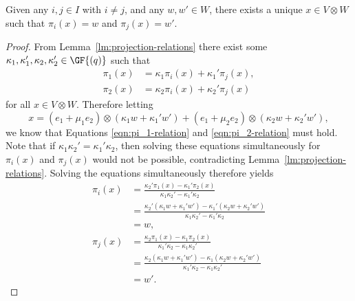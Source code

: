 \begin{lemma} \label{lm:two-projections-determines-tensor}
Given any $i, j \in I$ with $i \neq j$, and any $w, w' \in W$, there exists a unique $x \in V \otimes W$ such that $\pi_i{\left(x \right)} = w$ and $\pi_j{\left(x \right)} = w'$.
\end{lemma}
\begin{proof}
From Lemma~\ref{lm:projection-relations} there exist some $\kappa_1, \kappa_1', \kappa_2, \kappa_2' \in \GF{\left(q \right)}$ such that
\begin{align}
    \pi_1{\left(x \right)} &= \kappa_1 \pi_i{\left(x \right)} + \kappa_1' \pi_j{\left(x \right)}, \label{eqn:pi_1-relation} \\
    \pi_2{\left(x \right)} &= \kappa_2 \pi_i{\left(x \right)} + \kappa_2' \pi_j{\left(x \right)} \label{eqn:pi_2-relation}
\end{align}
for all $x \in V \otimes W$. Therefore letting
\begin{displaymath}
    x = \left(e_1 + \mu_1 e_2 \right) \otimes \left(\kappa_1 w + \kappa_1' w' \right) + \left(e_1 + \mu_2 e_2 \right) \otimes {\left(\kappa_2 w + \kappa_2' w' \right)},
\end{displaymath}
we know that Equations \eqref{eqn:pi_1-relation} and \eqref{eqn:pi_2-relation} must hold. Note that if $\kappa_1 \kappa_2' = \kappa_1' \kappa_2$, then solving these equations simultaneously for $\pi_i{\left(x \right)}$ and $\pi_j{\left(x \right)}$ would not be possible, contradicting Lemma~\ref{lm:projection-relations}. Solving the equations simultaneously therefore yields
\begin{align*}
    \pi_i{\left(x \right)} &= \frac{\kappa_2' \pi_1{\left(x \right)} - \kappa_1' \pi_2{\left(x \right)}}{\kappa_1 \kappa_2' - \kappa_1' \kappa_2} \\
    &= \frac{\kappa_2' \left(\kappa_1 w + \kappa_1' w' \right) - \kappa_1' \left(\kappa_2 w + \kappa_2' w' \right)}{\kappa_1 \kappa_2' - \kappa_1' \kappa_2} \\
    &= w, \\
    \pi_j{\left(x \right)} &= \frac{\kappa_2 \pi_1{\left(x \right)} - \kappa_1 \pi_2{\left(x \right)}}{\kappa_1' \kappa_2 - \kappa_1 \kappa_2'} \\
    &= \frac{\kappa_2 \left(\kappa_1 w + \kappa_1' w' \right) - \kappa_1 \left(\kappa_2 w + \kappa_2' w' \right)}{\kappa_1' \kappa_2 - \kappa_1 \kappa_2'} \\
    &= w'.
\end{align*}


\end{proof}
